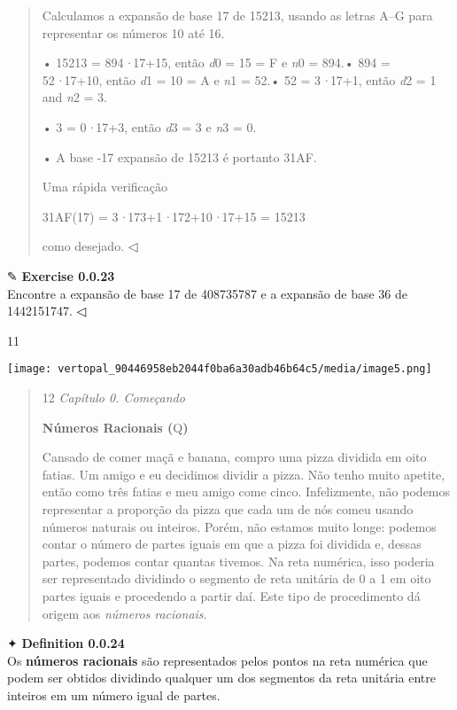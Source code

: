 \documentclass[
]{article}
\begin{document}
\begin{quote}
Calculamos a expansão de base 17 de 15213, usando as letras A--G para
representar os números 10 até 16.

• 15213 = 894\emph{·}17+15, então \emph{d}0 = 15 = F e \emph{n}0 = 894.•
894 = 52\emph{·}17+10, então \emph{d}1 = 10 = A e \emph{n}1 = 52.• 52 =
3\emph{·}17+1, então \emph{d}2 = 1 and \emph{n}2 = 3.

• 3 = 0\emph{·}17+3, então \emph{d}3 = 3 e \emph{n}3 = 0.

• A base -17 expansão de 15213 é portanto 31AF.

Uma rápida verificação

31AF(17) = 3\emph{·}173+1\emph{·}172+10\emph{·}17+15 = 15213

como desejado. ◁
\end{quote}

✎ \textbf{Exercise 0.0.23}\\
Encontre a expansão de base 17 de 408735787 e a expansão de base 36 de
1442151747. ◁

11

\texttt{[image: vertopal\_90446958eb2044f0ba6a30adb46b64c5/media/image5.png]}

\begin{quote}
12 \emph{Capítulo 0. Começando}

\textbf{Números Racionais (}Q\textbf{)}

Cansado de comer maçã e banana, compro uma pizza dividida em oito
fatias. Um amigo e eu decidimos dividir a pizza. Não tenho muito
apetite, então como três fatias e meu amigo come cinco. Infelizmente,
não podemos representar a proporção da pizza que cada um de nós comeu
usando números naturais ou inteiros. Porém, não estamos muito longe:
podemos contar o número de partes iguais em que a pizza foi dividida e,
dessas partes, podemos contar quantas tivemos. Na reta numérica, isso
poderia ser representado dividindo o segmento de reta unitária de 0 a 1
em oito partes iguais e procedendo a partir daí. Este tipo de
procedimento dá origem aos \emph{números racionais}.
\end{quote}

✦ \textbf{Definition 0.0.24}\\
Os \textbf{números racionais} são representados pelos pontos na reta
numérica que podem ser obtidos dividindo qualquer um dos segmentos da
reta unitária entre inteiros em um número igual de partes.
\end{document}
